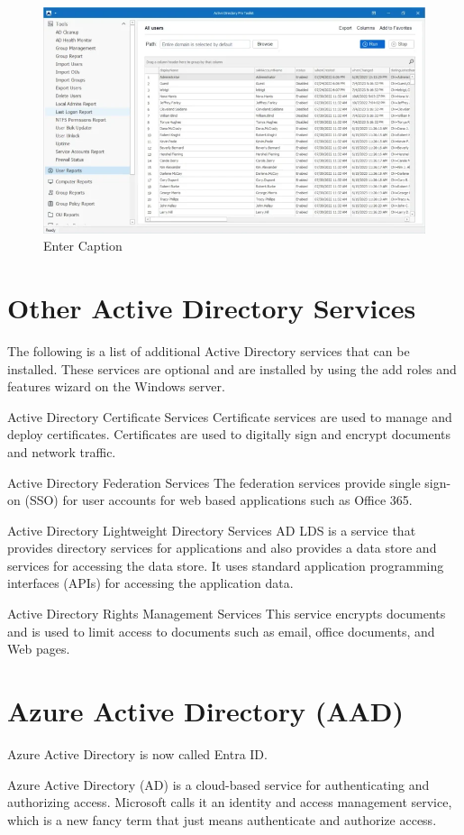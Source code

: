 \begin{figure}
    \centering
    \includegraphics[width=0.75\linewidth]{adtoolkit.png}
    \caption{Enter Caption}
    \label{fig:placeholder}
\end{figure}

\section{Other Active Directory Services}
The following is a list of additional Active Directory services that can be installed. These services are optional and are installed by using the add roles and features wizard on the Windows server.

Active Directory Certificate Services
Certificate services are used to manage and deploy certificates. Certificates are used to digitally sign and encrypt documents and network traffic.

Active Directory Federation Services
The federation services provide single sign-on (SSO) for user accounts for web based applications such as Office 365.

Active Directory Lightweight Directory Services
AD LDS is a service that provides directory services for applications and also provides a data store and services for accessing the data store. It uses standard application programming interfaces (APIs) for accessing the application data.

Active Directory Rights Management Services
This service encrypts documents and is used to limit access to documents such as email, office documents, and Web pages.

\section{Azure Active Directory (AAD)}
Azure Active Directory is now called Entra ID.

Azure Active Directory (AD) is a cloud-based service for authenticating and authorizing access. Microsoft calls it an identity and access management service, which is a new fancy term that just means authenticate and authorize access.

